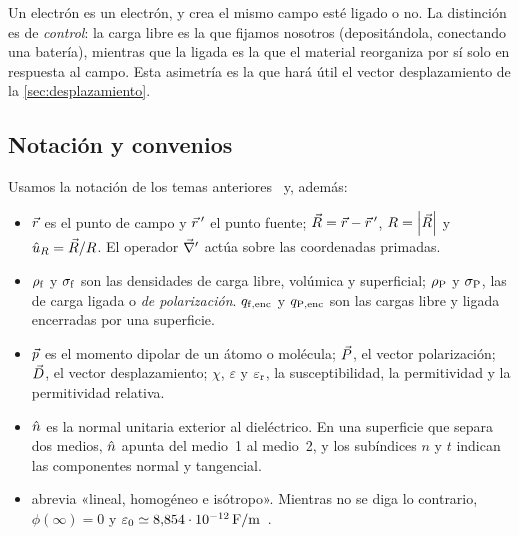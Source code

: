\begin{observacion}\label{obs:libre-ligada}
Un electrón es un electrón, y crea el mismo campo esté ligado o no. La distinción es de
\emph{control}: la carga libre es la que fijamos nosotros (depositándola, conectando una batería), mientras
que la ligada es la que el material reorganiza por sí solo en respuesta al campo. Esta asimetría es la que
hará útil el vector desplazamiento de la \cref{sec:desplazamiento}.
\end{observacion}

\subsection{Notación y convenios}\label{sec:notacion}

\begin{notacion}\label{not:tema4}
Usamos la notación de los temas anteriores~\cite{T0,T1,T2,T3} y, además:
\begin{itemize}
  \item $\vec r$ es el punto de campo y $\vec r\,'$ el punto fuente; $\vec R=\vec r-\vec r\,'$, $R=\left\lvert \vec R\right\rvert$ y
        $\hat u_{R}=\vec R/R$. El operador $\vec\nabla'$ actúa sobre las coordenadas primadas.
  \item $\rho_{\mathrm f}$ y $\sigma_{\mathrm f}$ son las densidades de carga libre, volúmica y superficial; $\rho_{\mathrm P}$ y $\sigma_{\mathrm P}$, las de
        carga ligada o \emph{de polarización}. $q_{\mathrm{f,enc}}$ y $q_{\mathrm{P,enc}}$ son las cargas libre y ligada
        encerradas por una superficie.
  \item $\vec p$ es el momento dipolar de un átomo o molécula; $\vec P$, el vector polarización; $\vec D$, el vector
        desplazamiento; $\chi$, $\varepsilon$ y $\varepsilon_{\mathrm r}$, la susceptibilidad, la permitividad y la permitividad relativa.
  \item $\hat n$ es la normal unitaria exterior al dieléctrico. En una superficie que separa dos medios, $\hat n$ apunta
        del medio~1 al medio~2, y los subíndices $n$ y $t$ indican las componentes normal y tangencial.
  \item \LHI{} abrevia «lineal, homogéneo e isótropo». Mientras no se diga lo contrario,
        $\phi(\infty)=0$ y $\varepsilon_0\simeq\SI{8.854e-12}{F/m}$~\cite{CODATA}.
\end{itemize}
\end{notacion}
